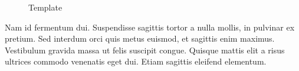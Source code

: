 \documentclass[sigconf]{acmart}
\begin{document}
\begin{figure}[h]
\centering
{}
\caption{Template}
\end{figure}

Nam id fermentum dui. Suspendisse sagittis tortor a nulla mollis, in
pulvinar ex pretium. Sed interdum orci quis metus euismod, et sagittis
enim maximus. Vestibulum gravida massa ut felis suscipit
congue. Quisque mattis elit a risus ultrices commodo venenatis eget
dui. Etiam sagittis eleifend elementum.
\end{document}
